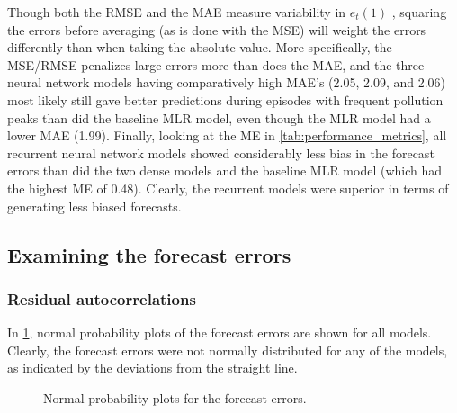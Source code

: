 \noindent
Though both the RMSE and the MAE measure variability in $e_t(1)$ , squaring the errors before averaging (as is done with the MSE) will weight the errors differently than when taking the absolute value. More specifically, the MSE/RMSE penalizes large errors more than does the MAE, and the three neural network models having comparatively high MAE's (2.05, 2.09, and 2.06) most likely still gave better predictions during episodes with frequent pollution peaks than did the baseline MLR model, even though the MLR model had a lower MAE (1.99). Finally, looking at the ME in \cref{tab:performance_metrics}, all recurrent neural network models showed considerably less bias in the forecast errors than did the two dense models and the baseline MLR model (which had the highest ME of 0.48). Clearly, the recurrent models were superior in terms of generating less biased forecasts. 

\subsection{Examining the forecast errors}
\subsubsection{Residual autocorrelations}
In \cref{fig:qq-plot-errors}, normal probability plots of the forecast errors are shown for all models. Clearly, the forecast errors were not normally distributed for any of the models, as indicated by the deviations from the straight line. 
\begin{figure}[h]
\centering
{}
\caption{Normal probability plots for the forecast errors.}
\label{fig:qq-plot-errors}
\end{figure}

